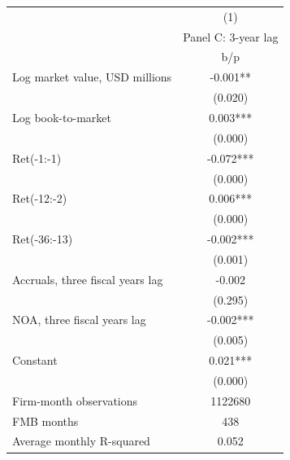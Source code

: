 {
\def\sym#1{\ifmmode^{#1}\else\(^{#1}\)\fi}
\begin{tabular}{l*{1}{c}}
\hline\hline
                    &\multicolumn{1}{c}{(1)}\\
                    &\multicolumn{1}{c}{Panel C: 3-year lag}\\
                    &         b/p   \\
\hline
Log market value, USD millions&      -0.001** \\
                    &     (0.020)   \\
Log book-to-market  &       0.003***\\
                    &     (0.000)   \\
Ret(-1:-1)          &      -0.072***\\
                    &     (0.000)   \\
Ret(-12:-2)         &       0.006***\\
                    &     (0.000)   \\
Ret(-36:-13)        &      -0.002***\\
                    &     (0.001)   \\
Accruals, three fiscal years lag&      -0.002   \\
                    &     (0.295)   \\
NOA, three fiscal years lag&      -0.002***\\
                    &     (0.005)   \\
Constant            &       0.021***\\
                    &     (0.000)   \\
\hline
Firm-month observations&     1122680   \\
FMB months          &         438   \\
Average monthly R-squared&       0.052   \\
\hline\hline
\end{tabular}
}

